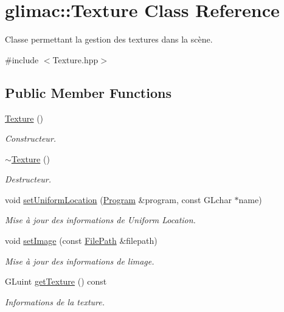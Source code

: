 \hypertarget{classglimac_1_1Texture}{}\section{glimac\+:\+:Texture Class Reference}
\label{classglimac_1_1Texture}


Classe permettant la gestion des textures dans la scène.  




{\ttfamily \#include $<$Texture.\+hpp$>$}

\subsection*{Public Member Functions}
\begin{DoxyCompactItemize}
\item 
\hyperlink{classglimac_1_1Texture_ac5ae4d92bf698dd77fb8135ae2329102}{Texture} ()
\begin{DoxyCompactList}\small\item\em Constructeur. \end{DoxyCompactList}\item 
\hyperlink{classglimac_1_1Texture_ad5c3fdead4adfd00168fd1ef7af1ee0b}{$\sim$\+Texture} ()
\begin{DoxyCompactList}\small\item\em Destructeur. \end{DoxyCompactList}\item 
void \hyperlink{classglimac_1_1Texture_a2a1e06217a8c98f4ddd7c271b7590c03}{set\+Uniform\+Location} (\hyperlink{classglimac_1_1Program}{Program} \&program, const G\+Lchar $\ast$name)
\begin{DoxyCompactList}\small\item\em Mise à jour des informations de Uniform Location. \end{DoxyCompactList}\item 
void \hyperlink{classglimac_1_1Texture_a412726a887d5b80d6382e0d25584661f}{set\+Image} (const \hyperlink{classglimac_1_1FilePath}{File\+Path} \&filepath)
\begin{DoxyCompactList}\small\item\em Mise à jour des informations de l\textquotesingle{}image. \end{DoxyCompactList}\item 
G\+Luint \hyperlink{classglimac_1_1Texture_a655260d62b7f46682d3531d5d1b5c975}{get\+Texture} () const
\begin{DoxyCompactList}\small\item\em Informations de la texture. \end{DoxyCompactList}\item 

\end{DoxyCompactItemize}
